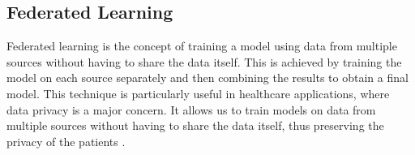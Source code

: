 \documentclass[../main.tex]{subfiles}
\begin{document}






    \subsection{Federated Learning} \label{sec:federated_learning} 

    Federated learning is the concept of training a model using data from multiple sources without having to share the data itself. This is achieved by training the model on each source separately and then combining the results to obtain a final model. This technique is particularly useful in healthcare applications, where data privacy is a major concern. It allows us to train models on data from multiple sources without having to share the data itself, thus preserving the privacy of the patients \cite{joshi_federated_2022}.
\end{document}
